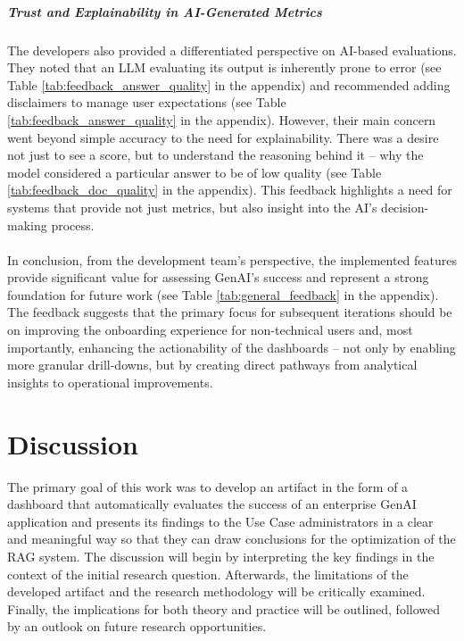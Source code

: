 \documentclass[
	english,
	ruledheaders=section,%
	class=report,%
	thesis={type=bachelor},%
	accentcolor=1b,%
	custommargins=true,%
	marginpar=false,%
	parskip=half-,%
	fontsize=11pt,%
	DIV=14,
]{tudapub}
\begin{document}
\paragraph{Trust and Explainability in AI-Generated Metrics} The developers also provided a differentiated perspective on AI-based evaluations. They noted that an LLM evaluating its output is inherently prone to error (see Table \ref{tab:feedback_answer_quality} in the appendix) and recommended adding disclaimers to manage user expectations (see Table \ref{tab:feedback_answer_quality} in the appendix). However, their main concern went beyond simple accuracy to the need for explainability. There was a desire not just to see a score, but to understand the reasoning behind it -- why the model considered a particular answer to be of low quality (see Table \ref{tab:feedback_doc_quality} in the appendix). This feedback highlights a need for systems that provide not just metrics, but also insight into the AI's decision-making process.\\
\\
In conclusion, from the development team's perspective, the implemented features provide significant value for assessing GenAI's success and represent a strong foundation for future work (see Table \ref{tab:general_feedback} in the appendix). The feedback suggests that the primary focus for subsequent iterations should be on improving the onboarding experience for non-technical users and, most importantly, enhancing the actionability of the dashboards -- not only by enabling more granular drill-downs, but by creating direct pathways from analytical insights to operational improvements.

\chapter{Discussion}
The primary goal of this work was to develop an artifact in the form of a dashboard that automatically evaluates the success of an enterprise GenAI application and presents its findings to the Use Case administrators in a clear and meaningful way so that they can draw conclusions for the optimization of the RAG system. The discussion will begin by interpreting the key findings in the context of the initial research question. Afterwards, the limitations of the developed artifact and the research methodology will be critically examined. Finally, the implications for both theory and practice will be outlined, followed by an outlook on future research opportunities.
\end{document}
